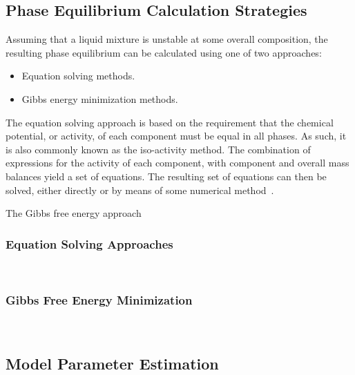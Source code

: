 \subsection{Phase Equilibrium Calculation Strategies}

Assuming that a liquid mixture is unstable at some overall composition, the resulting phase equilibrium can be calculated using one of two approaches:~\cite{PhaseEquilCalcsESandGEM}\

\begin{itemize}
\item Equation solving methods.\
\item Gibbs energy minimization methods.
\end{itemize}

The equation solving approach is based on the requirement that the chemical potential, or activity, of each component must be equal in all phases. As such, it is also commonly known as the iso-activity method. The combination of expressions for the activity of each component, with component and overall mass balances yield a set of equations. The resulting set of equations can then be solved, either directly or by means of some numerical method~\cite{PhaseEquilCalcsESandGEM}.\

The Gibbs free energy approach 



	\subsubsection{Equation Solving Approaches}\
	\subsubsection{Gibbs Free Energy Minimization}\
	


\subsection{Model Parameter Estimation} \label{ModelParameterEstimationSection}
